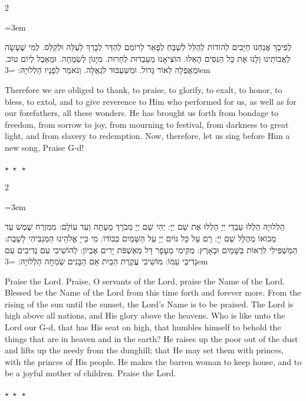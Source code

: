 \documentclass[11pt, openany]{book}
\newenvironment{bilingual}{%
  \par\vspace{4pt}%
  \begin{paracol}{2}%
}{%
  \end{paracol}%
  \par\vspace{2pt}%
}
\newenvironment{hebrewcol}{%
  \switchcolumn[1]%
  \begingroup
  \RTL
  \hebrewfont\large
  \setstretch{1.4}%
  \emergencystretch=3em
  \tolerance=9999
  \parindent=0pt\relax
}{%
  \endRTL
  \endgroup
}
\newenvironment{englishcol}{%
  \switchcolumn[0]%
  \begingroup
  \setstretch{1.4}%
  \emergencystretch=3em
  \tolerance=9999
  \normalsize
  \rightskip=0.12in\relax
}{%
  \endgroup
}
\newcommand{\parasep}{%
  \par\vspace{3pt}
  \begin{center}
    \textcolor{sedergold!50}{\small$\star\;\star\;\star$}
  \end{center}
  \par\vspace{3pt}
}
\begin{document}
\begin{bilingual}
\begin{hebrewcol}
לְפִיכָךְ אֲנַחְנוּ חַיָּבִים לְהוֹדוֹת לְהַלֵּל לְשַׁבֵּחַ לְפָאֵר לְרוֹמֵם לְהַדֵּר לְבָרֵךְ לְעַלֵּה וּלְקַלֵּס. לְמִי שֶׁעָשָׂה לַאֲבוֹתֵינוּ וְלָנוּ אֶת כָּל הַנִּסִּים הָאֵלּוּ. הוֹצִיאָנוּ מֵעַבְדוּת לְחֵרוּת. מִיָּגוֹן לְשִׂמְחָה.
וּמֵאֵבֶל לְיוֹם טוֹב. וּמֵאֲפֵלָה לְאוֹר גָּדוֹל. וּמִשִּׁעְבּוּד לִגְאֻלָּה. וְנאֹמַר לְפָנָיו הַלְלוּיָהּ:
\end{hebrewcol}
\begin{englishcol}
Therefore we are obliged to thank, to praise, to glorify, to exalt, to honor, to bless, to extol, and to give reverence to Him who performed for us, as well as for our forefathers, all these wonders. He has brought us forth from bondage to freedom, from sorrow to joy, from mourning to festival, from darkness to great light, and from slavery to redemption. Now, therefore, let us sing before Him a new song, Praise G-d!
\end{englishcol}
\end{bilingual}
\parasep

\begin{bilingual}
\begin{hebrewcol}
הַלְלוּיָהּ הַלְלוּ עַבְדֵי יְיָ הַלְלוּ אֶת שֵׁם יְיָ: יְהִי שֵׁם יְיָ מְבֹרָךְ מֵעַתָּה וְעַד עוֹלָם: מִמִּזְרַח שֶׁמֶשׁ עַד מְבוֹאוֹ מְהֻלָּל שֵׁם יְיָ: רָם עַל כָּל גּוֹיִם יְיָ עַל הַשָּׁמַיִם כְּבוֹדוֹ: מִי כַּייָ אֱלֹהֵינוּ הַמַּגְבִּיהִי לָשָׁבֶת: הַמַּשְׁפִּילִי לִרְאוֹת בַּשָּׁמַיִם וּבָאָרֶץ: מְקִימִי מֵעָפָר דָּל מֵאַשְׁפֹּת יָרִים אֶבְיוֹן: לְהוֹשִׁיבִי עִם נְדִיבִים עִם נְדִיבֵי עַמּוֹ: מוֹשִׁיבִי עֲקֶרֶת הַבַּיִת אֵם הַבָּנִים שְׂמֵחָה הַלְלוּיָהּ:
\end{hebrewcol}
\begin{englishcol}
Praise the Lord. Praise, O servants of the Lord, praise the Name of the Lord. Blessed be the Name of the Lord from this time forth and forever more. From the rising of the sun until the sunset, the Lord's Name is to be praised. The Lord is high above all nations, and His glory above the heavens. Who is like unto the Lord our G-d, that has His seat on high, that humbles himself to behold the things that are in heaven and in the earth? He raises up the poor out of the dust and lifts up the needy from the dunghill; that He may set them with princes, with the princes of His people. He makes the barren woman to keep house, and to be a joyful mother of children. Praise the Lord.
\end{englishcol}
\end{bilingual}
\parasep
\end{document}
